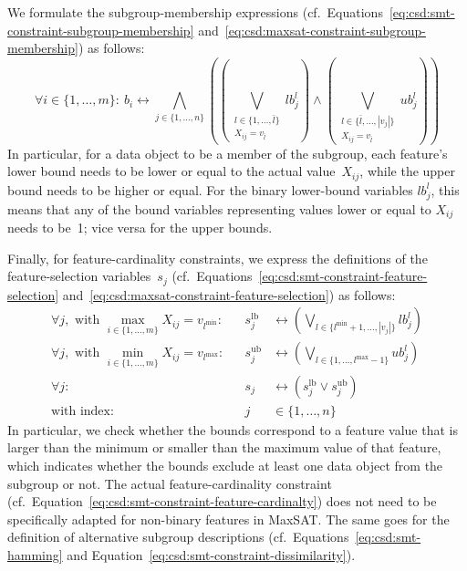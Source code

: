 \documentclass{article}
\theoremstyle{definition}
\begin{document}
We formulate the subgroup-membership expressions (cf.~Equations~\ref{eq:csd:smt-constraint-subgroup-membership} and~\ref{eq:csd:maxsat-constraint-subgroup-membership}) as follows:
%
\begin{equation}
	\forall i \in \{1, \dots, m\}:~ b_i\leftrightarrow \bigwedge_{j \in \{1, \dots, n\}} \left( \left( \bigvee_{\substack{l \in \{1, \dots, \bar{l}\} \\ X_{ij} = v_{\bar{l}} }} \mathit{lb}^l_j \right) \land \left( \bigvee_{\substack{l \in \{\bar{l}, \dots, |v_j|\} \\ X_{ij} = v_{\bar{l}} }} \mathit{ub}^l_j \right) \right)
	\label{eq:csd:maxsat-numeric-constraint-subgroup-membership}
\end{equation}
%
In particular, for a data object to be a member of the subgroup, each feature's lower bound needs to be lower or equal to the actual value~$X_{ij}$, while the upper bound needs to be higher or equal.
For the binary lower-bound variables $\mathit{lb}^l_j$, this means that any of the bound variables representing values lower or equal to $X_{ij}$ needs to be~1; vice versa for the upper bounds.

Finally, for feature-cardinality constraints, we express the definitions of the feature-selection variables~$s_j$ (cf.~Equations~\ref{eq:csd:smt-constraint-feature-selection} and~\ref{eq:csd:maxsat-constraint-feature-selection}) as follows:
%
\begin{equation}
	\begin{aligned}
		\forall j, \text{ with } \max_{i \in \{1, \dots, m\}} X_{ij} = v_{l^{\text{min}}}: & & s^{\text{lb}}_j &\leftrightarrow \left( \bigvee_{l \in \{l^{\text{min}} + 1, \dots, |v_j|\}} \mathit{lb}^l_j \right) \\
		\forall j, \text{ with } \min_{i \in \{1, \dots, m\}} X_{ij} = v_{l^{\text{max}}}: & & s^{\text{ub}}_j &\leftrightarrow \left( \bigvee_{l \in \{ 1, \dots, l^{\text{max}} - 1\}} \mathit{ub}^l_j \right) \\
		\forall j: & & s_j &\leftrightarrow \left( s^{\text{lb}}_j \lor s^{\text{ub}}_j \right) \\
		\text{with index:} & & j &\in \{1, \dots, n\}
	\end{aligned}
	\label{eq:csd:maxsat-numeric-constraint-feature-selection}
\end{equation}
%
In particular, we check whether the bounds correspond to a feature value that is larger than the minimum or smaller than the maximum value of that feature, which indicates whether the bounds exclude at least one data object from the subgroup or not.
The actual feature-cardinality constraint (cf.~Equation~\ref{eq:csd:smt-constraint-feature-cardinalty}) does not need to be specifically adapted for non-binary features in MaxSAT.
The same goes for the definition of alternative subgroup descriptions (cf.~Equations~\ref{eq:csd:smt-hamming} and Equation~\ref{eq:csd:smt-constraint-dissimilarity}).
\end{document}
